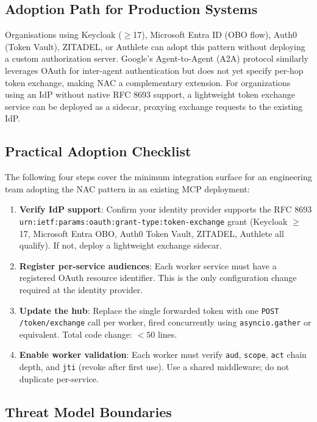 \documentclass[journal]{IEEEtran}
\begin{document}
\subsection{Adoption Path for Production Systems}

Organisations using Keycloak ($\geq$17), Microsoft Entra ID (OBO flow), Auth0
(Token Vault), ZITADEL, or Authlete can adopt this pattern without deploying a
custom authorization server. Google's Agent-to-Agent (A2A) protocol
\cite{google_a2a} similarly leverages OAuth for inter-agent authentication but
does not yet specify per-hop token exchange, making NAC a complementary
extension. For organizations using an IdP without native
RFC 8693 support, a lightweight token exchange service can be deployed as a
sidecar, proxying exchange requests to the existing IdP.

\subsection{Practical Adoption Checklist}

The following four steps cover the minimum integration surface for an engineering
team adopting the NAC pattern in an existing MCP deployment:

\begin{enumerate}
  \item \textbf{Verify IdP support}: Confirm your identity provider supports the
        RFC 8693 \texttt{urn:ietf:params:oauth:grant-type:token-exchange} grant
        (Keycloak $\geq$17, Microsoft Entra OBO, Auth0 Token Vault, ZITADEL,
        Authlete all qualify). If not, deploy a lightweight exchange sidecar.
  \item \textbf{Register per-service audiences}: Each worker service must have a
        registered OAuth resource identifier. This is the only configuration change
        required at the identity provider.
  \item \textbf{Update the hub}: Replace the single forwarded token with one
        \texttt{POST /token/exchange} call per worker, fired concurrently using
        \texttt{asyncio.gather} or equivalent. Total code change: $<50$ lines.
  \item \textbf{Enable worker validation}: Each worker must verify \texttt{aud},
        \texttt{scope}, \texttt{act} chain depth, and \texttt{jti} (revoke after
        first use). Use a shared middleware; do not duplicate per-service.
\end{enumerate}

\subsection{Threat Model Boundaries}
\end{document}
